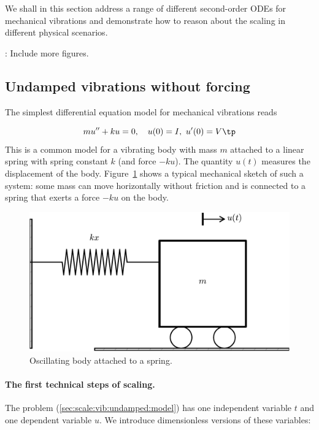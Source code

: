 \documentclass[graybox,envcountchap,sectrefs,final]{svmonodo}
\newcommand{\shortinlinecomment}[3]{{\color{red}{\bf #1}: #2}}
\begin{document}
We shall in this section
address a range of different second-order ODEs for mechanical
vibrations and demonstrate how to reason about the scaling in
different physical scenarios.

\shortinlinecomment{hpl 7}{ Include more figures. }{ Include more figures. }

\subsection{Undamped vibrations without forcing}
\label{sec:scale:vib:undamped}

The simplest differential equation model for mechanical vibrations
reads

\begin{equation}
mu'' + ku = 0,\quad u(0)=I,\ u'(0)=V\tp
\label{sec:scale:vib:undamped:model}
\end{equation}
This is a common model for a vibrating body  with mass $m$ attached
to a linear spring with spring constant $k$ (and force $-ku$).
The quantity $u(t)$ measures the displacement of the body.
Figure~\ref{sec:scale:vib:undamped:sketch} shows a typical mechanical
sketch of such a system: some mass can move horizontally without friction
and is connected to a spring that exerts a force $-ku$ on the body.


\begin{figure}[!ht]  %
  \centerline{\includegraphics[width=0.6\linewidth]{fig-scaling/oscillator_spring.pdf}}
  \caption{
  Oscillating body attached to a spring. \label{sec:scale:vib:undamped:sketch}
  }
\end{figure}


\paragraph{The first technical steps of scaling.}
The problem (\ref{sec:scale:vib:undamped:model}) has one independent
variable $t$ and one dependent variable $u$. We introduce dimensionless
versions of these variables:
\end{document}

